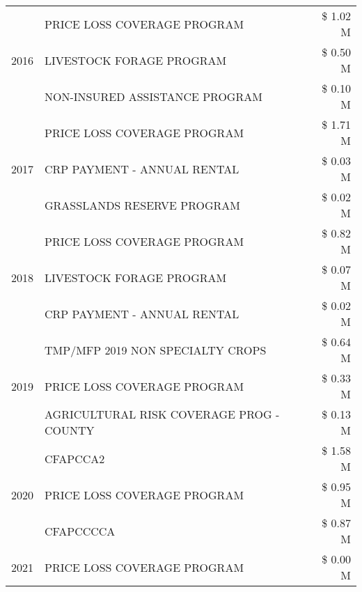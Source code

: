 \begin{tabular}{llr}
\multirow[t]{3}{*}{2016} & PRICE LOSS COVERAGE PROGRAM & \$ 1.02 M \\
 & LIVESTOCK FORAGE PROGRAM & \$ 0.50 M \\
 & NON-INSURED ASSISTANCE PROGRAM & \$ 0.10 M \\
\cline{1-3}
\multirow[t]{3}{*}{2017} & PRICE LOSS COVERAGE PROGRAM & \$ 1.71 M \\
 & CRP PAYMENT - ANNUAL RENTAL & \$ 0.03 M \\
 & GRASSLANDS RESERVE PROGRAM & \$ 0.02 M \\
\cline{1-3}
\multirow[t]{3}{*}{2018} & PRICE LOSS COVERAGE PROGRAM & \$ 0.82 M \\
 & LIVESTOCK FORAGE PROGRAM & \$ 0.07 M \\
 & CRP PAYMENT - ANNUAL RENTAL & \$ 0.02 M \\
\cline{1-3}
\multirow[t]{3}{*}{2019} & TMP/MFP 2019 NON SPECIALTY CROPS & \$ 0.64 M \\
 & PRICE LOSS COVERAGE PROGRAM & \$ 0.33 M \\
 & AGRICULTURAL RISK COVERAGE PROG - COUNTY & \$ 0.13 M \\
\cline{1-3}
\multirow[t]{3}{*}{2020} & CFAPCCA2 & \$ 1.58 M \\
 & PRICE LOSS COVERAGE PROGRAM & \$ 0.95 M \\
 & CFAPCCCCA & \$ 0.87 M \\
\cline{1-3}
2021 & PRICE LOSS COVERAGE PROGRAM & \$ 0.00 M \\
\cline{1-3}
\bottomrule
\end{tabular}

